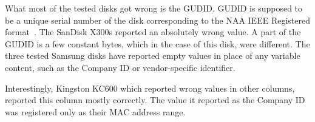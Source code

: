 What most of the tested disks got wrong is the GUDID. GUDID is supposed to be a unique serial number of the disk corresponding to the NAA IEEE Registered format~\cite{spc-4}.
The SanDisk X300s reported an absolutely wrong value. A part of the GUDID is a few constant bytes, which in the case of this disk, were different.
The three tested Samsung disks have reported empty values in place of any variable content, such as the Company ID or vendor-specific identifier.

Interestingly, Kingston KC600 which reported wrong values in other columns, reported this column mostly correctly. The value it reported as the Company ID was registered only as their MAC address range.








